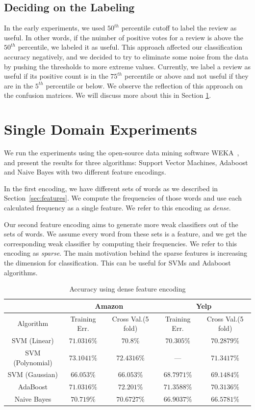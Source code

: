 \documentclass[letterpaper]{article}
\begin{document}
\subsection{Deciding on the Labeling}
In the early experiments, we used $50^{th}$ percentile cutoff to label
the review as useful. In other words, if the nuimber of positive votes
for a review is above the $50^{th}$ percentile, we labeled it as
useful. This approach affected our classification accuracy negatively,
and we decided to try to eliminate some noise from the data by pushing
the thresholds to more extreme values. Currently, we label a review as
useful if its positive count is in the $75^{th}$ percentile or above
and not useful if they are in the $5^{th}$ percentile or below. We
observe the reflection of this approach on the confusion matrices. We
will discuss more about this in Section \ref{sec:single_domain}.

\section{Single Domain Experiments}
\label{sec:single_domain}  
We run the experiments using the open-source data mining software
WEKA~\cite{weka}, and present the results for three algorithms:
Support Vector Machines, Adaboost and Naive Bayes with two different
feature encodings.

In the first encoding, we have different sets of words as we described
in Section~\ref{sec:features}. We compute the frequencies of those
words and use each calculated frequency as a single feature. We refer to
this encoding as \emph{dense}.

Our second feature encoding aims to generate more weak classifiers out
of the sets of words. We assume every word from these sets is a
feature, and we get the corresponding weak classifier by computing
their frequencies. We refer to this encoding as \emph{sparse}. The
main motivation behind the sparse features is increasing the dimension
for classification. This can be useful for SVMs and Adaboost
algorithms.

\begin{table}[ht]
\centering
\begin{tabular}{c | c c | c c}
 & \multicolumn{2}{|c|}{Amazon} & \multicolumn{2}{|c}{Yelp} \\
\hline
Algorithm & Training Err. & Cross Val.(5 fold) & Training Err. & Cross Val.(5 fold)\\
\hline
SVM (Linear) 		& $71.0316\%$ & $70.8\%$ & $70.305\%$ & $70.2879\%$\\
SVM (Polynomial) 	& $73.1041\%$ & $72.4316\%$ & --- & $71.3417\%$\\
SVM (Gaussian) 		& $66.053\%$ & $66.053\%$ & $68.7971\%$ & $69.1484\%$\\
AdaBoost 			& $71.0316\%$ & $72.201\%$ & $71.3588\%$ & $70.3136\%$\\ 
Naive Bayes 		& $70.719\%$ & $70.6727\%$ & $66.9037\%$ & $66.5781\%$\\ 
\end{tabular}
\caption{Accuracy using dense feature encoding}
\label{tab:dense}
\end{table}
\end{document}
